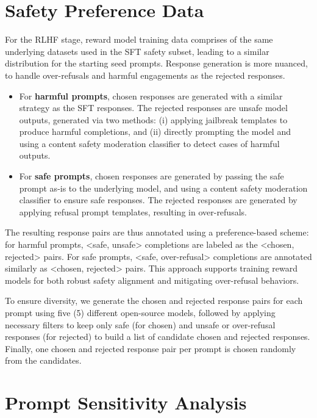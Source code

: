 \section{Safety Preference Data}
\label{sec:safety_pref_data}
For the RLHF stage, reward model training data comprises of the same underlying datasets used in the SFT safety subset, leading to a similar distribution for the starting seed prompts. Response generation is more nuanced, to handle over-refusals and harmful engagements as the rejected responses. 
\begin{itemize}
\vspace{-1em}
    \item For \textbf{harmful prompts}, chosen responses are generated with a similar strategy as the SFT responses. The rejected responses are unsafe model outputs, generated via two methods: (i) applying jailbreak templates to produce harmful completions, and (ii) directly prompting the model and using a content safety moderation classifier to detect cases of harmful outputs.
    \item For \textbf{safe prompts}, chosen responses are generated by passing the safe prompt as-is to the underlying model, and using a content safety moderation classifier to ensure safe responses. The rejected responses are generated by applying refusal prompt templates, resulting in over-refusals.
\end{itemize} 
\vspace{-1em}
The resulting response pairs are thus annotated using a preference-based scheme: for harmful prompts, <safe, unsafe> completions are labeled as the <chosen, rejected> pairs. For safe prompts, <safe, over-refusal> completions are annotated similarly as <chosen, rejected> pairs. This approach supports training reward models for both robust safety alignment and mitigating over-refusal behaviors.

To ensure diversity, we generate the chosen and rejected response pairs for each prompt using five (5) different open-source models, followed by applying necessary filters to keep only safe (for chosen) and unsafe or over-refusal responses (for rejected) to build a list of candidate chosen and rejected responses. Finally, one chosen and rejected response pair per prompt is chosen randomly from the candidates.  


\section{Prompt Sensitivity Analysis}
\label{sec:prompt_sens}

